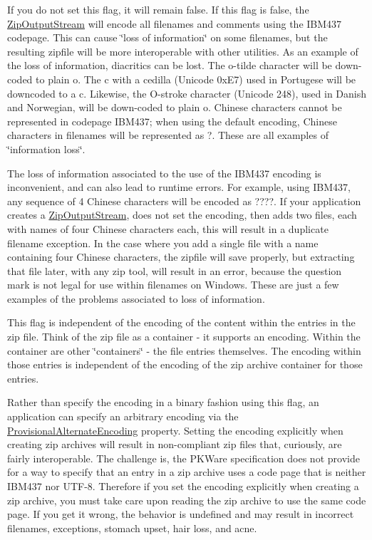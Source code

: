 If you do not set this flag, it will remain false. If this flag is false, the {\ttfamily \mbox{\hyperlink{class_super_tiled2_unity_1_1_ionic_1_1_zip_1_1_zip_output_stream}{Zip\+Output\+Stream}}} will encode all filenames and comments using the I\+B\+M437 codepage. This can cause \char`\"{}loss of information\char`\"{} on some filenames, but the resulting zipfile will be more interoperable with other utilities. As an example of the loss of information, diacritics can be lost. The o-\/tilde character will be down-\/coded to plain o. The c with a cedilla (Unicode 0x\+E7) used in Portugese will be downcoded to a c. Likewise, the O-\/stroke character (Unicode 248), used in Danish and Norwegian, will be down-\/coded to plain o. Chinese characters cannot be represented in codepage I\+B\+M437; when using the default encoding, Chinese characters in filenames will be represented as ?. These are all examples of \char`\"{}information loss\char`\"{}. 

The loss of information associated to the use of the I\+B\+M437 encoding is inconvenient, and can also lead to runtime errors. For example, using I\+B\+M437, any sequence of 4 Chinese characters will be encoded as ????. If your application creates a {\ttfamily \mbox{\hyperlink{class_super_tiled2_unity_1_1_ionic_1_1_zip_1_1_zip_output_stream}{Zip\+Output\+Stream}}}, does not set the encoding, then adds two files, each with names of four Chinese characters each, this will result in a duplicate filename exception. In the case where you add a single file with a name containing four Chinese characters, the zipfile will save properly, but extracting that file later, with any zip tool, will result in an error, because the question mark is not legal for use within filenames on Windows. These are just a few examples of the problems associated to loss of information. 

This flag is independent of the encoding of the content within the entries in the zip file. Think of the zip file as a container -\/ it supports an encoding. Within the container are other \char`\"{}containers\char`\"{} -\/ the file entries themselves. The encoding within those entries is independent of the encoding of the zip archive container for those entries. 

Rather than specify the encoding in a binary fashion using this flag, an application can specify an arbitrary encoding via the \mbox{\hyperlink{class_super_tiled2_unity_1_1_ionic_1_1_zip_1_1_zip_output_stream_aec3ac84c19c3f7c1c7ded0cf4ebba5cf}{Provisional\+Alternate\+Encoding}} property. Setting the encoding explicitly when creating zip archives will result in non-\/compliant zip files that, curiously, are fairly interoperable. The challenge is, the P\+K\+Ware specification does not provide for a way to specify that an entry in a zip archive uses a code page that is neither I\+B\+M437 nor U\+T\+F-\/8. Therefore if you set the encoding explicitly when creating a zip archive, you must take care upon reading the zip archive to use the same code page. If you get it wrong, the behavior is undefined and may result in incorrect filenames, exceptions, stomach upset, hair loss, and acne. 

